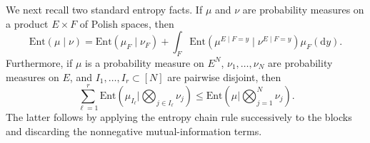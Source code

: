 \documentclass[10pt,a4paper,reqno]{amsart}
\numberwithin{equation}{section}
\theoremstyle{plain}
\theoremstyle{definition}
\theoremstyle{remark}
\renewcommand{\d}{\mathrm d}
\newcommand{\Ent}{\mathrm{Ent}}
\newcommand{\1}{\mathbf 1}
\begin{document}
We next recall two standard entropy facts.  If \(\mu\) and \(\nu\) are
probability measures on a product \(E\times F\) of Polish spaces, then
\begin{equation}
  \Ent(\mu\mid\nu)
  =
  \Ent(\mu_F\mid\nu_F)
  +
  \int_F
  \Ent\left(
    \mu^{E\mid F=y}
    \mid
    \nu^{E\mid F=y}
  \right)\mu_F(\d y).
  \label{eq:eta-entropy-chain-rule}
\end{equation}
Furthermore, if \(\mu\) is a probability measure on \(E^N\),
\(\nu_1,\ldots,\nu_N\) are probability measures on \(E\), and
\(I_1,\ldots,I_r\subset[N]\) are pairwise disjoint, then
\begin{equation}
  \sum_{\ell=1}^r
  \Ent\left(
    \mu_{I_\ell}
    \mathrel{\bigg|}
    \bigotimes_{j\in I_\ell}\nu_j
  \right) \le \Ent\left(
    \mu
    \mathrel{\bigg|}
    \bigotimes_{j=1}^N\nu_j
  \right).
  \label{eq:eta-block-superadditivity}
\end{equation}
The latter follows by applying the entropy chain rule successively to the
blocks and discarding the nonnegative mutual-information terms.
\end{document}
